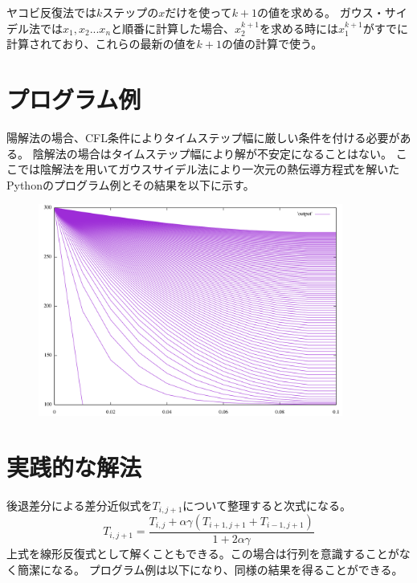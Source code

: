 \documentclass{ujarticle}
\begin{document}
ヤコビ反復法では$k$ステップの$x$だけを使って$k+1$の値を求める。
ガウス・サイデル法では$x_{1},x_{2}...x_{n}$と順番に計算した場合、$x_{2}^{k+1}$を求める時には$x_{1}^{k+1}$がすでに計算されており、これらの最新の値を$k+1$の値の計算で使う。

\section{プログラム例}
陽解法の場合、CFL条件によりタイムステップ幅に厳しい条件を付ける必要がある。
陰解法の場合はタイムステップ幅により解が不安定になることはない。
ここでは陰解法を用いてガウスサイデル法により一次元の熱伝導方程式を解いたPythonのプログラム例とその結果を以下に示す。
\begin{figure}[h]
	\begin{center}
		\includegraphics[width=100mm]{heat.png}
	\end{center}
\end{figure}

\section{実践的な解法}
後退差分による差分近似式を$T_{i,j+1}$について整理すると次式になる。
\begin{equation}
T_{i,j+1}=\frac{T_{i,j}+\alpha \gamma (T_{i+1,j+1} + T_{i-1,j+1})}{1+2 \alpha \gamma}
\end{equation}
上式を線形反復式として解くこともできる。この場合は行列を意識することがなく簡潔になる。
プログラム例は以下になり、同様の結果を得ることができる。
\end{document}
